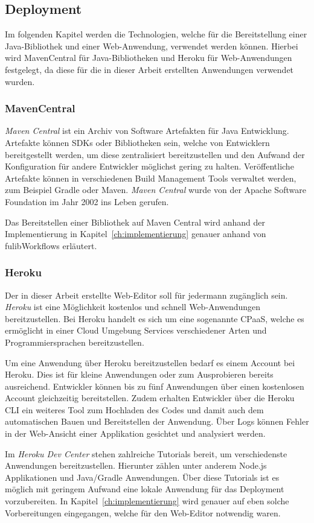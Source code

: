 \subsection{Deployment}\label{subsec:deployment}
Im folgenden Kapitel werden die Technologien, welche für die Bereitstellung einer Java-Bibliothek und einer Web-Anwendung, verwendet werden können.
Hierbei wird MavenCentral für Java-Bibliotheken und Heroku für Web-Anwendungen festgelegt, da diese für die in dieser Arbeit erstellten
Anwendungen verwendet wurden.

\subsubsection{MavenCentral}\label{subsubsec:mavencentral}
\textit{Maven Central} ist ein Archiv von Software Artefakten für Java Entwicklung.
Artefakte können \ac{SDK}s oder Bibliotheken sein, welche von Entwicklern bereitgestellt werden, um diese zentralisiert bereitzustellen
und den Aufwand der Konfiguration für andere Entwickler möglichst gering zu halten.\cite*{maven}
Veröffentliche Artefakte können in verschiedenen Build Management Tools verwaltet werden, zum Beispiel Gradle oder Maven.
\textit{Maven Central} wurde von der Apache Software Foundation im Jahr 2002 ins Leben gerufen.

Das Bereitstellen einer Bibliothek auf Maven Central wird anhand der Implementierung in Kapitel~\ref{ch:implementierung} genauer anhand von
fulibWorkflows erläutert.


\subsubsection{Heroku}\label{subsubsec:heroku}
Der in dieser Arbeit erstellte Web-Editor soll für jedermann zugänglich sein.
\textit{Heroku} ist eine Möglichkeit kostenlos und schnell Web-Anwendungen bereitzustellen.
Bei Heroku handelt es sich um eine sogenannte \ac{CPaaS}, welche es ermöglicht in einer Cloud Umgebung
Services verschiedener Arten und Programmiersprachen bereitzustellen.\cite*{heroku}

Um eine Anwendung über Heroku bereitzustellen bedarf es einem Account bei Heroku.
Dies ist für kleine Anwendungen oder zum Ausprobieren bereits ausreichend.
Entwickler können bis zu fünf Anwendungen über einen kostenlosen Account gleichzeitig bereitstellen.
Zudem erhalten Entwickler über die Heroku CLI ein weiteres Tool zum Hochladen des Codes und damit auch dem automatischen
Bauen und Bereitstellen der Anwendung.
Über Logs können Fehler in der Web-Ansicht einer Applikation gesichtet und analysiert werden.

Im \textit{Heroku Dev Center} stehen zahlreiche Tutorials bereit, um verschiedenste Anwendungen bereitzustellen.
Hierunter zählen unter anderem Node.js Applikationen und Java/Gradle Anwendungen.\cite*{herokuDev}
Über diese Tutorials ist es möglich mit geringem Aufwand eine lokale Anwendung für das Deployment vorzubereiten.
In Kapitel~\ref{ch:implementierung} wird genauer auf eben solche Vorbereitungen eingegangen, welche für den Web-Editor notwendig waren.
